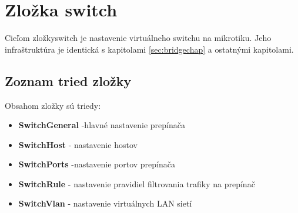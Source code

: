 \section{Zložka switch}
Cieľom zložkyswitch je nastavenie virtuálneho switchu na mikrotiku. Jeho infraštruktúra je identická s kapitolami \ref{sec:bridgechap} a ostatnými kapitolami. 
\subsection{Zoznam tried zložky}
Obsahom zložky sú triedy:
\begin{itemize}
\item \textbf{SwitchGeneral} -hlavné nastavenie prepínača
\item \textbf{SwitchHost} - nastavenie hostov
\item \textbf{SwitchPorts} -nastavenie portov prepínača
\item \textbf{SwitchRule} - nastavenie pravidiel filtrovania trafiky na prepínač
\item \textbf{SwitchVlan} - nastavenie virtuálnych LAN sietí
\end{itemize}
